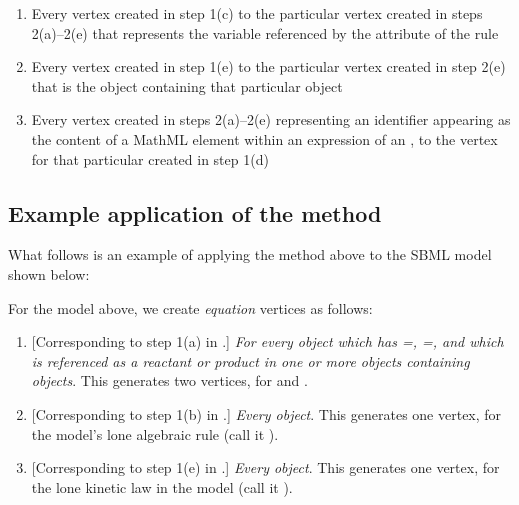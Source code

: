 \begin{enumerate}
\begin{enumerate}
  \item Every vertex created in step 1(c) to the particular vertex
    created in steps 2(a)--2(e) that represents the variable
    referenced by the  attribute of the rule
    
  \item Every vertex created in step 1(e) to the particular vertex
    created in step 2(e) that is the \Reaction object containing
    that particular \KineticLaw object
    
  \item Every vertex created in steps 2(a)--2(e) representing an
    identifier appearing as the content of a MathML 
    element within an expression of an \AlgebraicRule, to the
    vertex for that particular \AlgebraicRule created in step 1(d)
    
  \end{enumerate}

\end{enumerate}


\subsection*{Example application of the method}

What follows is an example of applying the method above to the
SBML model shown below:


For the model above, we create \emph{equation} vertices as
follows:
\begin{enumerate}\setlength{\parskip}{0.2ex}
  
\item{} [Corresponding to step 1(a) in
  .]  \emph{For every \Species
    object which has =,
    =, and which is referenced as a
    reactant or product in one or more \Reaction objects
    containing \KineticLaw objects}.  This generates two vertices,
  for  and .
  
\item{} [Corresponding to step 1(b)
  in .] \emph{Every
    \AlgebraicRule object}.  This generates one vertex, for the
  model's lone algebraic rule (call it ).
  
\item{} [Corresponding to step 1(e)
  in .] \emph{Every \KineticLaw
    object}.  This generates one vertex, for the lone kinetic law
  in the model (call it ).

\end{enumerate}

